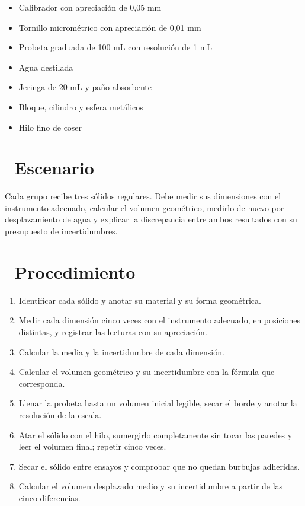 \documentclass[11pt,a4paper]{article}
\newcommand{\iconotexto}[2]{\textcolor{cyanNeon}{\faIcon{#1}}~#2}
\begin{document}
\begin{itemize}[leftmargin=1.4em,itemsep=2pt,topsep=3pt]
  \item Calibrador con apreciación de 0,05 mm
  \item Tornillo micrométrico con apreciación de 0,01 mm
  \item Probeta graduada de 100 mL con resolución de 1 mL
  \item Agua destilada
  \item Jeringa de 20 mL y paño absorbente
  \item Bloque, cilindro y esfera metálicos
  \item Hilo fino de coser
\end{itemize}

\section{\iconotexto{flask}{Escenario}}

Cada grupo recibe tres sólidos regulares. Debe medir sus dimensiones con el instrumento adecuado, calcular el volumen geométrico, medirlo de nuevo por desplazamiento de agua y explicar la discrepancia entre ambos resultados con su presupuesto de incertidumbres.

\section{\iconotexto{list-ol}{Procedimiento}}

\begin{enumerate}[leftmargin=1.4em,itemsep=2pt,topsep=3pt]
  \item Identificar cada sólido y anotar su material y su forma geométrica.
  \item Medir cada dimensión cinco veces con el instrumento adecuado, en posiciones distintas, y registrar las lecturas con su apreciación.
  \item Calcular la media y la incertidumbre de cada dimensión.
  \item Calcular el volumen geométrico y su incertidumbre con la fórmula que corresponda.
  \item Llenar la probeta hasta un volumen inicial legible, secar el borde y anotar la resolución de la escala.
  \item Atar el sólido con el hilo, sumergirlo completamente sin tocar las paredes y leer el volumen final; repetir cinco veces.
  \item Secar el sólido entre ensayos y comprobar que no quedan burbujas adheridas.
  \item Calcular el volumen desplazado medio y su incertidumbre a partir de las cinco diferencias.
\end{enumerate}
\end{document}
